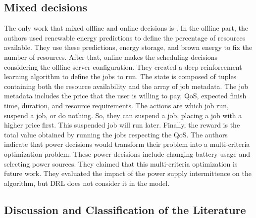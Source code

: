 \subsection{Mixed decisions}

The only work that mixed offline and online decisions is \cite{venkataswamy2023rare}. In the offline part, the authors used renewable energy predictions to define the percentage of resources available. They use these predictions, energy storage, and brown energy to fix the number of resources. After that, online makes the scheduling decisions considering the offline server configuration. They created a deep reinforcement learning algorithm to define the jobs to run. The state is composed of tuples containing both the resource availability and the array of job metadata. The job metadata includes the price that the user is willing to pay, QoS, expected finish time, duration, and resource requirements. The actions are which job run, suspend a job, or do nothing. So, they can suspend a job, placing a job with a higher price first. This suspended job will run later. Finally, the reward is the total value obtained by running the jobs respecting the QoS. The authors indicate that power decisions would transform their problem into a multi-criteria optimization problem. These power decisions include changing battery usage and selecting power sources. They claimed that this multi-criteria optimization is future work. They evaluated the impact of the power supply intermittence on the algorithm, but DRL does not consider it in the model.

\subsection{Discussion and Classification of the Literature}

